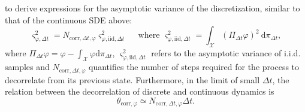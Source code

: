 \documentclass[11pt, twoside]{report}
\newtheorem{assumption}[theorem]{Assumption}
\begin{document}
to derive expressions for the asymptotic variance of the discretization, similar to that of the continuous SDE above:
\begin{equation}
\varsigma_{\varphi, \Delta t}^2=N_{\mathrm{corr}, \Delta t, \varphi} \varsigma_{\varphi, \mathrm{iid}, \Delta t}^2 \quad \text { where } \varsigma_{\varphi, \mathrm{iid}, \Delta t}^2=\int_{\mathcal{X}}\left(\Pi_{\Delta t} \varphi\right)^2 \mathrm{~d} \pi_{\Delta t},
\end{equation}
where $\Pi_{\Delta t} \varphi=\varphi-\int_{\mathcal{X}} \varphi \mathrm{d} \pi_{\Delta t}$, $\varsigma_{\varphi, \mathrm{iid}, \Delta t}^2$ refers to the asymptotic variance of i.i.d. samples and $N_{\mathrm{corr}, \Delta t, \varphi}$ quantifies the number of steps required for the process to decorrelate from its previous state. Furthermore, in the limit of small $\Delta t$, the relation between the decorrelation of discrete and continuous dynamics is
$$\theta_{\mathrm{corr}, \varphi} \simeq N_{\mathrm{corr}, \Delta t, \varphi} \Delta t.$$

\end{document}
